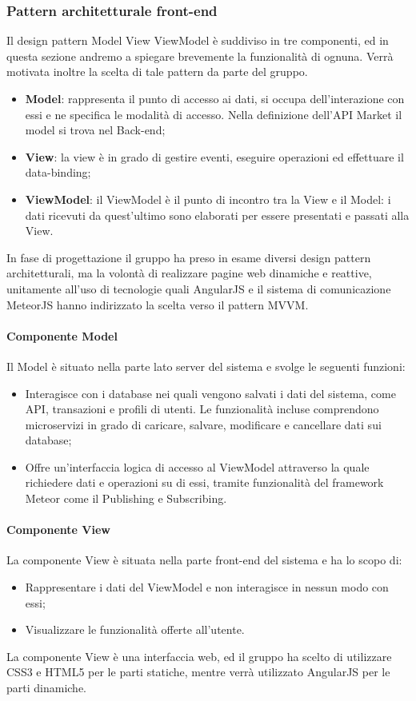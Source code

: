 \subsubsection{Pattern architetturale front-end}
Il design pattern Model View ViewModel è suddiviso in tre componenti, ed in questa sezione andremo a spiegare brevemente la funzionalità di ognuna. Verrà motivata inoltre la scelta di tale pattern da parte del gruppo.

\begin{itemize}
	\item \textbf{Model}: rappresenta il punto di accesso ai dati, si occupa dell'interazione con essi e ne specifica le modalità di accesso. Nella definizione dell'API Market il model si trova nel Back-end;
	\item \textbf{View}: la view è in grado di gestire eventi, eseguire operazioni ed effettuare il data-binding;
	\item \textbf{ViewModel}: il ViewModel è  il punto di incontro tra la View e il Model: i dati ricevuti da quest’ultimo sono elaborati per essere presentati e passati alla View.
\end{itemize}

In fase di progettazione il gruppo ha preso in esame diversi design pattern architetturali, ma la volontà di realizzare pagine web dinamiche e reattive, unitamente all'uso di tecnologie quali AngularJS e il sistema di comunicazione MeteorJS hanno indirizzato la scelta verso il pattern MVVM.

\paragraph{Componente Model}
Il Model è situato nella parte lato server del sistema e svolge le seguenti funzioni:
\begin{itemize}
	\item Interagisce con i database nei quali vengono salvati i dati del sistema, come API, transazioni e profili di utenti. Le funzionalità incluse comprendono microservizi in grado di caricare, salvare, modificare e cancellare dati sui database;
	\item Offre un'interfaccia logica di accesso al ViewModel attraverso la quale richiedere dati e operazioni su di essi, tramite funzionalità del framework Meteor come il Publishing e Subscribing.
\end{itemize}
\paragraph{Componente View}
La componente View è situata nella parte front-end del sistema e ha lo scopo di:
\begin{itemize}
	\item Rappresentare i dati del ViewModel e non interagisce in nessun modo con essi;
	\item Visualizzare le funzionalità offerte all'utente.
\end{itemize} 
La componente View è una interfaccia web, ed il gruppo ha scelto di utilizzare CSS3 e HTML5 per le parti statiche, mentre verrà utilizzato AngularJS per le parti dinamiche. 
